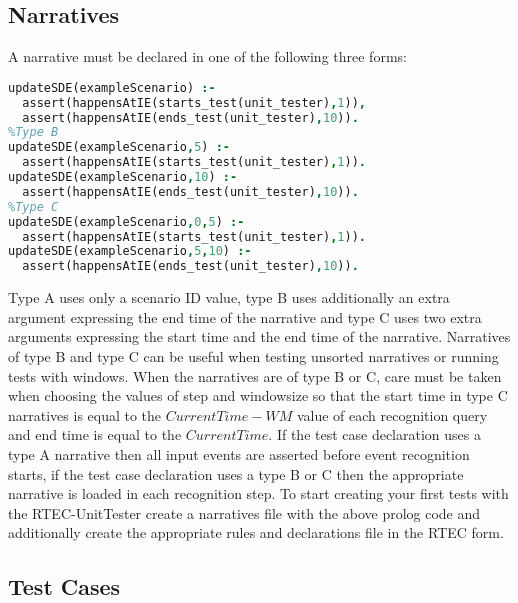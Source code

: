 \documentclass[a4paper,10pt]{article}
\begin{document}
\subsection{Narratives}
A narrative must be declared in one of the following three forms:
\begin{lstlisting}[language=Prolog]
%Type A
updateSDE(exampleScenario) :-
  assert(happensAtIE(starts_test(unit_tester),1)),
  assert(happensAtIE(ends_test(unit_tester),10)).
%Type B  
updateSDE(exampleScenario,5) :-
  assert(happensAtIE(starts_test(unit_tester),1)).
updateSDE(exampleScenario,10) :-
  assert(happensAtIE(ends_test(unit_tester),10)).
%Type C
updateSDE(exampleScenario,0,5) :-
  assert(happensAtIE(starts_test(unit_tester),1)).
updateSDE(exampleScenario,5,10) :-
  assert(happensAtIE(ends_test(unit_tester),10)).
\end{lstlisting}
Type A uses only a scenario ID value, type B uses additionally an extra argument expressing the end time of the narrative and type C uses two extra arguments expressing the start time and the end time of the narrative. Narratives of type B and type C can be useful when testing unsorted narratives or running tests with windows. When the narratives are of type B or C, care must be taken when choosing the values of step and windowsize so that the start time in type C narratives is equal to the $CurrentTime-WM$ value of each recognition query and end time is equal to the $CurrentTime$. If the test case declaration uses a type A narrative then all input events are asserted before event recognition starts, if the test case declaration uses a type B or C then the appropriate narrative is loaded in each recognition step. To start creating your first tests with the RTEC-UnitTester create a narratives file with the above prolog code and additionally create the appropriate rules and declarations file in the RTEC form.

\subsection{Test Cases}
\end{document}
